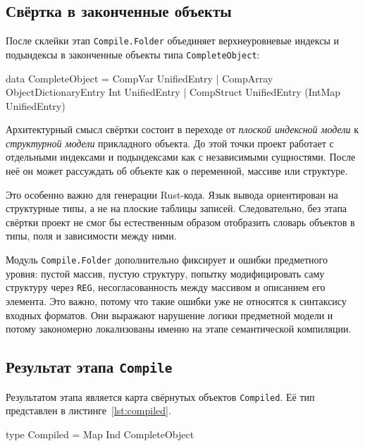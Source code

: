 \documentclass[a4paper,12pt]{article}
\begin{document}
\subsection{Свёртка в законченные объекты}

После склейки этап \texttt{Compile.Folder} объединяет верхнеуровневые индексы и
подындексы в законченные объекты типа \texttt{CompleteObject}:

\begin{flushleft}
\label{lst:complete-object}
\begin{MyCodes}
data CompleteObject
  = CompVar    UnifiedEntry
  | CompArray  ObjectDictionaryEntry Int UnifiedEntry
  | CompStruct UnifiedEntry (IntMap UnifiedEntry)
\end{MyCodes}
\end{flushleft}

Архитектурный смысл свёртки состоит в переходе от \textit{плоской индексной модели} к
\textit{структурной модели} прикладного объекта. До этой точки проект работает с
отдельными индексами и подындексами как с независимыми сущностями. После неё он может
рассуждать об объекте как о переменной, массиве или структуре.

Это особенно важно для генерации Rust-кода. Язык вывода ориентирован на структурные
типы, а не на плоские таблицы записей. Следовательно, без этапа свёртки проект не смог
бы естественным образом отобразить словарь объектов в типы, поля и зависимости между
ними.

Модуль \texttt{Compile.Folder} дополнительно фиксирует и ошибки предметного уровня:
пустой массив, пустую структуру, попытку модифицировать саму структуру через
\texttt{REG}, несогласованность между массивом и описанием его элемента. Это важно,
потому что такие ошибки уже не относятся к синтаксису входных форматов. Они выражают
нарушение логики предметной модели и потому закономерно локализованы именно на этапе
семантической компиляции.

\subsection{Результат этапа \texttt{Compile}}

Результатом этапа является карта свёрнутых объектов \texttt{Compiled}. Её тип
представлен в листинге~\ref{lst:compiled}.
\begin{flushleft}
\label{lst:compiled}
\begin{MyCodes}
type Compiled = Map Ind CompleteObject
\end{MyCodes}
\end{flushleft}
\end{document}
